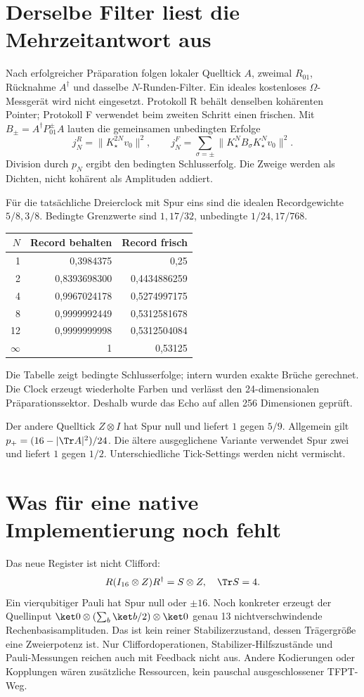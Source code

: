 \section{Derselbe Filter liest die Mehrzeitantwort aus}
Nach erfolgreicher Präparation folgen lokaler Quelltick $A$, zweimal $R_{01}$, Rücknahme $A^\dagger$ und dasselbe $N$-Runden-Filter. Ein ideales kostenloses $\Omega$-Messgerät wird nicht eingesetzt. Protokoll R behält denselben kohärenten Pointer; Protokoll F verwendet beim zweiten Schritt einen frischen. Mit $B_\pm=A^\dagger P^\pm_{01}A$ lauten die gemeinsamen unbedingten Erfolge
\begin{equation}
j_N^R=\|K_\star^{2N}v_0\|^2,\qquad
j_N^F=\sum_{\sigma=\pm}\|K_\star^NB_\sigma K_\star^Nv_0\|^2.
\end{equation}
Division durch $p_N$ ergibt den bedingten Schlusserfolg. Die Zweige werden als Dichten, nicht kohärent als Amplituden addiert.

Für die tatsächliche Dreierclock mit Spur eins sind die idealen Recordgewichte $5/8,3/8$. Bedingte Grenzwerte sind $1,17/32$, unbedingte $1/24,17/768$.
\begin{center}\begin{tabular}{rrr}
\toprule $N$&Record behalten&Record frisch\\\midrule
1&0,3984375&0,25\\
2&0,8393698300&0,4434886259\\
4&0,9967024178&0,5274997175\\
8&0,9999992449&0,5312581678\\
12&0,9999999998&0,5312504084\\
$\infty$&1&0,53125\\\bottomrule
\end{tabular}\end{center}
Die Tabelle zeigt bedingte Schlusserfolge; intern wurden exakte Brüche gerechnet. Die Clock erzeugt wiederholte Farben und verlässt den 24-dimensionalen Präparationssektor. Deshalb wurde das Echo auf allen 256 Dimensionen geprüft.

Der andere Quelltick $Z\otimes I$ hat Spur null und liefert $1$ gegen $5/9$. Allgemein gilt $p_+=(16-|\Tr A|^2)/24$. Die ältere ausgeglichene Variante verwendet Spur zwei und liefert $1$ gegen $1/2$. Unterschiedliche Tick-Settings werden nicht vermischt.

\section{Was für eine native Implementierung noch fehlt}
Das neue Register ist nicht Clifford:
\begin{equation}
R(I_{16}\otimes Z)R^\dagger=S\otimes Z,\quad \Tr S=4.
\end{equation}
Ein vierqubitiger Pauli hat Spur null oder $\pm16$. Noch konkreter erzeugt der Quellinput $\ket0\otimes(\sum_b\ket b/2)\otimes\ket0$ genau 13 nichtverschwindende Rechenbasisamplituden. Das ist kein reiner Stabilizerzustand, dessen Trägergröße eine Zweierpotenz ist. Nur Cliffordoperationen, Stabilizer-Hilfszustände und Pauli-Messungen reichen auch mit Feedback nicht aus. Andere Kodierungen oder Kopplungen wären zusätzliche Ressourcen, kein pauschal ausgeschlossener TFPT-Weg.

